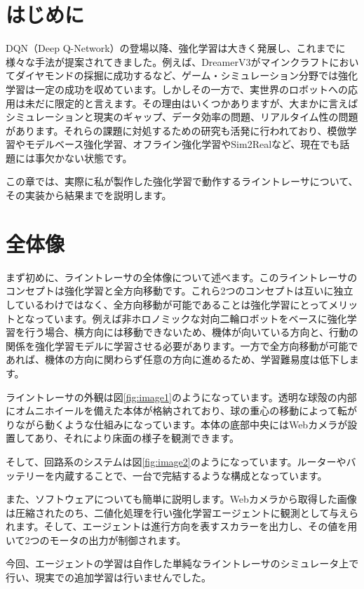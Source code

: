 \section{はじめに}
DQN（Deep Q-Network\cite{mnih2013playing}）の登場以降、強化学習は大きく発展し、これまでに様々な手法が提案されてきました。例えば、DreamerV3\cite{hafner2024masteringdiversedomainsworld}がマインクラフトにおいてダイヤモンドの採掘に成功するなど、ゲーム・シミュレーション分野では強化学習は一定の成功を収めています。しかしその一方で、実世界のロボットへの応用は未だに限定的と言えます。その理由はいくつかありますが、大まかに言えばシミュレーションと現実のギャップ、データ効率の問題、リアルタイム性の問題があります。それらの課題に対処するための研究も活発に行われており、模倣学習やモデルベース強化学習、オフライン強化学習やSim2Realなど、現在でも話題には事欠かない状態です。

この章では、実際に私が製作した強化学習で動作するライントレーサについて、その実装から結果までを説明します。

\section{全体像}
まず初めに、ライントレーサの全体像について述べます。このライントレーサのコンセプトは強化学習と全方向移動です。これら2つのコンセプトは互いに独立しているわけではなく、全方向移動が可能であることは強化学習にとってメリットとなっています。例えば非ホロノミックな対向二輪ロボットをベースに強化学習を行う場合、横方向には移動できないため、機体が向いている方向と、行動の関係を強化学習モデルに学習させる必要があります。一方で全方向移動が可能であれば、機体の方向に関わらず任意の方向に進めるため、学習難易度は低下します。

ライントレーサの外観は図\ref{fig:image1}のようになっています。透明な球殻の内部にオムニホイールを備えた本体が格納されており、球の重心の移動によって転がりながら動くような仕組みになっています。本体の底部中央にはWebカメラが設置してあり、それにより床面の様子を観測できます。

そして、回路系のシステムは図\ref{fig:image2}のようになっています。ルーターやバッテリーを内蔵することで、一台で完結するような構成となっています。

また、ソフトウェアについても簡単に説明します。Webカメラから取得した画像は圧縮されたのち、二値化処理を行い強化学習エージェントに観測として与えられます。そして、エージェントは進行方向を表すスカラーを出力し、その値を用いて2つのモータの出力が制御されます。

今回、エージェントの学習は自作した単純なライントレーサのシミュレータ上で行い、現実での追加学習は行いませんでした。

